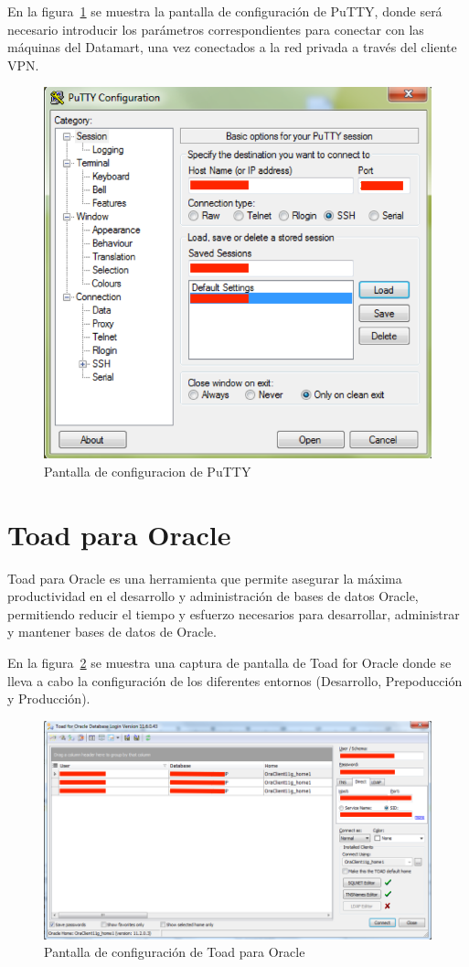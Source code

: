 \documentclass[a4paper, 12pt]{book}
\begin{document}
En la figura~\ref{fig:PuTTY_Config} se muestra la pantalla de configuración de PuTTY, donde será necesario introducir los parámetros correspondientes para conectar con las máquinas del Datamart, una vez conectados a la red privada a través del cliente VPN.

\begin{figure}
   \centering
   \includegraphics[width=12cm, keepaspectratio]{img/puttyconfig}
   \caption{Pantalla de configuracion de PuTTY}
   \label{fig:PuTTY_Config}
\end{figure}

\section{Toad para Oracle}
\label{sec:Toad para Oracle}
Toad para Oracle es una herramienta que permite asegurar la máxima productividad en el desarrollo y administración de bases de datos Oracle, permitiendo reducir el tiempo y esfuerzo necesarios para desarrollar, administrar y mantener bases de datos de Oracle.

En la figura~\ref{fig:Toad_Config} se muestra una captura de pantalla de Toad for Oracle donde se lleva a cabo la configuración de los diferentes entornos (Desarrollo, Prepoducción y Producción).

\begin{figure}
   \centering
   \includegraphics[width=12cm, keepaspectratio]{img/toadconfig}
   \caption{Pantalla de configuración de Toad para Oracle}
   \label{fig:Toad_Config}
\end{figure}
\end{document}
